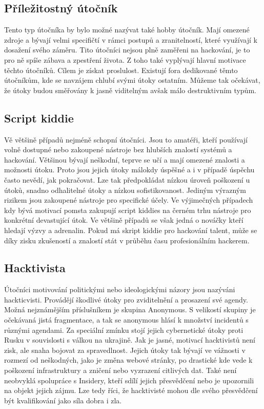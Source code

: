\subsection{Příležitostný útočník}
Tento typ útočníka by bylo možné nazývat také hobby útočník.
Mají omezené zdroje a bývají velmi specifičtí v rámci postupů a zranitelností, které využívají k dosažení svého záměru.
Tito útočníci nejsou plně zaměřeni na hackování, je to pro ně spíše zábava a zpestření života.
Z toho také vyplývají hlavní motivace těchto útočníků.
Cílem je získat proslulost.
Existují fora dedikované těmto útočníkům, kde se navzájem chlubí svými útoky ostatním.
Můžeme tak očekávat, že útoky budou směřovány k jasně viditelným avšak málo destruktivním typům.

\subsection{Script kiddie}
Vě většině případů nejméně schopní útočníci.
Jsou to amatéři, kteří používají volně dostupné nebo zakoupené nástroje bez hlubších znalostí systémů a hackování.
Většinou bývají neškodní, teprve se učí a mají omezené znalosti a možnosti útoku.
Proto jsou jejich útoky málokdy úspěšné a i v případě úspěchu často nevědí, jak pokračovat.
Lze tak předpokládat nízkou úroveň poškození u útoků, snadno odhalitelné útoky a nízkou sofistikovanost.
Jediným výrazným rizikem jsou zakoupené nástroje pro specifické účely.
Ve výjimečných případech kdy bývá motivací pomsta zakupují script kiddies na černém trhu nástroje pro konkrétní devastující útok.
Ve většině případů se však jedná o nováčky kteří hledají výzvy a adrenalin.
Pokud má skript kiddie pro hackování talent, může se díky zisku zkušeností a znalostí stát v průběhu času profesionálním hackerem.

\subsection{Hacktivista}
Útočníci motivování politickými nebo ideologickými názory jsou nazýváni hackticvisti.
Provádějí škodlivé útoky pro zviditelnění a prosazení své agendy.
Možná nejznámějším příslušníkem je skupina Anonymous.
S velikostí skupiny je očekávaná jistá fragmentace, a tak se anonymous hlásí k množství incidentů s různými agendami.
Za speciální zmínku stojí jejich cybernetické útoky proti Rusku v souvislosti s válkou na ukrajině\cite{anonymous_russian_attacks}.
Jak je jasné, motivací hacktivistů není zisk, ale snaha bojovat za spravedlnost.
Jejich útoky tak bývají ve vážnosti v rozmezí od neškodných, jako je změna webové stránky, po drastické kde vede k poškození infrastruktury a zničení nebo vyzrazení citlivých dat.
Také není neobvyklá spolupráce s Insidery, kteří sdílí jejich přesvědčení nebo je upozornili na objekt jejich zájmu.
Lze tedy říci, že hacktivisté mohou dle svého přesvědčení být kvalifikování jako síla dobra i zla.


